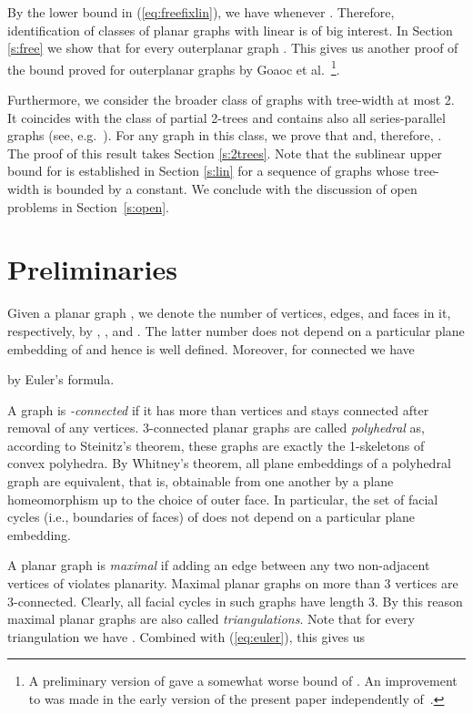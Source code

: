 \documentclass[reqno,12pt]{amsart}
\newcommand{\refeq}[1]{(\ref{eq:#1})}
\begin{document}
By the lower bound in \refeq{freefixlin}, we have  whenever
. Therefore, identification of classes of planar graphs with linear 
is of big interest. In Section \ref{s:free} we show that
 for every outerplanar graph .
This gives us another proof of the bound  proved for
outerplanar graphs by Goaoc et al.~\cite{merged}\footnote{A preliminary version of \cite{merged} gave a somewhat worse bound of .
An improvement to  was made in the early version of the present paper
independently of~\cite{merged}.}.

Furthermore, we consider the broader class of graphs with tree-width at most 2.
It coincides with the class of partial 2-trees and contains also all series-parallel graphs
(see, e.g.\ \cite[Sect.\ 8.3]{Bodlaender98}). For any graph  in this class, we prove
that  and, therefore, .
The proof of this result takes Section \ref{s:2trees}.
Note that the sublinear upper bound for  is established in Section \ref{s:lin}
for a sequence of graphs whose tree-width is bounded by a constant.
We conclude with the discussion of open problems in Section~\ref{s:open}.




\section{Preliminaries}\label{s:prel}

Given a planar graph , we denote the number of vertices, edges,
and faces in it, respectively, by , , and . The latter number
does not depend on a particular plane embedding of  and hence is well defined.
Moreover, for connected  we have

by Euler's formula. 

A graph is \emph{-connected} if it has more than  vertices and 
stays connected after removal of any  vertices. 
3-connected planar graphs are called \emph{polyhedral}
as, according to Steinitz's theorem, 
these graphs are exactly the 1-skeletons of convex polyhedra.
By Whitney's theorem, all plane embeddings of a polyhedral
graph  are equivalent, that is, obtainable from one another by a plane homeomorphism
up to the choice of outer face. In particular, the set of facial cycles (i.e.,
boundaries of faces) of  does not depend on a particular plane embedding.

A planar graph  is \emph{maximal} if adding an edge between any two 
non-adjacent vertices of  violates planarity. Maximal planar graphs 
on more than 3 vertices are
3-connected. Clearly, all facial cycles in such graphs have length 3.
By this reason maximal planar graphs are also called \emph{triangulations}.
Note that for every triangulation  we have
.
Combined with \refeq{euler}, this gives us
\end{document}
